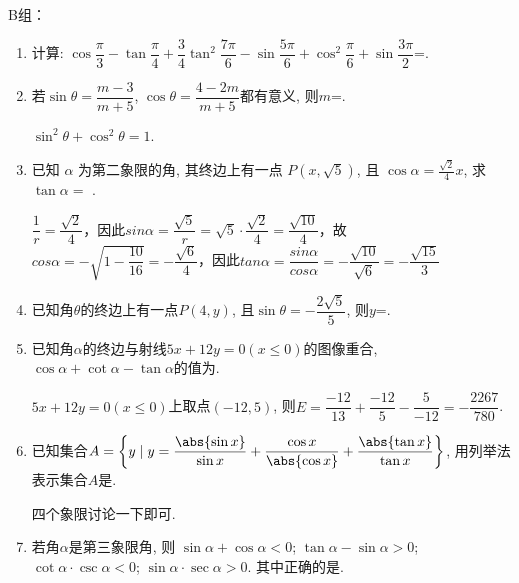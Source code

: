 B组：
\begin{enumerate}
\item 计算: $\cos\dfrac{\pi}{3}-\tan\dfrac{\pi}{4}+\dfrac{3}{4}\tan^2\dfrac{7\pi}{6}-\sin\dfrac{5\pi}{6}+\cos^2\dfrac{\pi}{6}+\sin\dfrac{3\pi}{2}$=. 

\item 若$\sin\theta=\dfrac{m-3}{m+5}$, $\cos\theta=\dfrac{4-2m}{m+5}$都有意义, 则$m$=. 
\begin{jieda}
$\sin^2\theta+\cos^2\theta=1$. 
\end{jieda}


\item 已知 $\alpha$ 为第二象限的角, 其终边上有一点 $P(x, \sqrt{5})$, 且 $\cos \alpha=\frac{\sqrt{2}}{4} x$, 求 $\tan \alpha =$ .
\begin{jieda}
    $\dfrac{1}{r} = \dfrac{\sqrt{2}}{4}$，因此$sin\alpha = \dfrac{\sqrt{5}}{r} = \sqrt{5} \cdot \dfrac{\sqrt{2}}{4} = \dfrac{\sqrt{10}}{4}$，故$cos\alpha = -\sqrt{1 - \dfrac{10}{16}} = -\dfrac{\sqrt{6}}{4}$，因此$tan\alpha = \dfrac{sin\alpha}{cos\alpha} = -\dfrac{\sqrt{10}}{\sqrt{6}} = -\dfrac{\sqrt{15}}{3}$
\end{jieda}


\item 已知角$\theta$的终边上有一点$P(4,y)$, 且$\sin\theta=-\dfrac{2\sqrt{5}}{5}$, 则$y$=. 

\item 已知角$\alpha$的终边与射线$5x+12y=0(x\leq 0)$的图像重合, $\cos\alpha+\cot\alpha-\tan\alpha$的值为. 
\begin{jieda}
$5x+12y=0(x\leq 0)$上取点$(-12,5)$, 
则$E=\dfrac{-12}{13}+\dfrac{-12}{5}-\dfrac{5}{-12}=-\dfrac{2267}{780}$. 
\end{jieda}


\item 已知集合$A=\left\{y\mid y=\dfrac{\abs{\sin{x}}}{\sin{x}}+\dfrac{\cos{x}}{\abs{\cos{x}}}+\dfrac{\abs{\tan{x}}}{\tan{x}}\right\}$, 
用列举法表示集合$A$是. 
\begin{jieda}
四个象限讨论一下即可. 
\end{jieda}


\item 若角$\alpha$是第三象限角, 则
 $\sin\alpha+\cos\alpha<0$; 
 $\tan\alpha-\sin\alpha>0$; 
 $\cot\alpha\cdot\csc\alpha<0$; 
 $\sin\alpha\cdot\sec\alpha>0$. 
其中正确的是.  


\end{enumerate}
